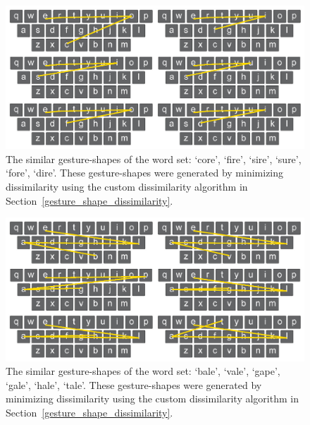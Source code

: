 \clearpage

\begin{figure}[t]
	\centering
	\includegraphics[width=5in]{Figures/fig_words_6}
	\caption[Word Set 6]{The similar gesture-shapes of the word set: `core', `fire', `sire', `sure', `fore', `dire'. These gesture-shapes were generated by minimizing dissimilarity using the custom dissimilarity algorithm in Section~\ref{gesture_shape_dissimilarity}.}
	\label{fig_words_6}
\end{figure}

\begin{figure}[b]
	\centering
	\includegraphics[width=5in]{Figures/fig_words_7}
	\caption[Word Set 7]{The similar gesture-shapes of the word set: `bale', `vale', `gape', `gale', `hale', `tale'. These gesture-shapes were generated by minimizing dissimilarity using the custom dissimilarity algorithm in Section~\ref{gesture_shape_dissimilarity}.}
	\label{fig_words_7}
\end{figure}

\clearpage

